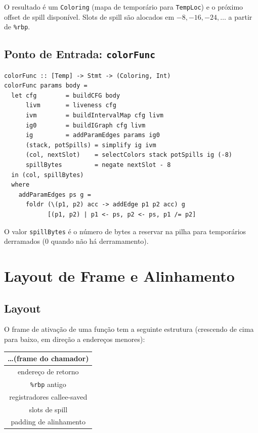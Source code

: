 O resultado é um \texttt{Coloring} (mapa de temporário para
\texttt{TempLoc}) e o próximo offset de spill disponível. Slots de spill
são alocados em $-8, -16, -24, \ldots$ a partir de \texttt{\%rbp}.

\subsection{Ponto de Entrada: \texttt{colorFunc}}

\begin{verbatim}
colorFunc :: [Temp] -> Stmt -> (Coloring, Int)
colorFunc params body =
  let cfg        = buildCFG body
      livm       = liveness cfg
      ivm        = buildIntervalMap cfg livm
      ig0        = buildIGraph cfg livm
      ig         = addParamEdges params ig0
      (stack, potSpills) = simplify ig ivm
      (col, nextSlot)    = selectColors stack potSpills ig (-8)
      spillBytes         = negate nextSlot - 8
  in (col, spillBytes)
  where
    addParamEdges ps g =
      foldr (\(p1, p2) acc -> addEdge p1 p2 acc) g
            [(p1, p2) | p1 <- ps, p2 <- ps, p1 /= p2]
\end{verbatim}

O valor \texttt{spillBytes} é o número de bytes a reservar na pilha para
temporários derramados ($0$ quando não há derramamento).

\section{Layout de Frame e Alinhamento}

\subsection{Layout}

O frame de ativação de uma função tem a seguinte estrutura (crescendo
de cima para baixo, em direção a endereços menores):

\begin{center}
  \begin{tabular}{|c|}
    \hline
    \ldots (frame do chamador) \\
    \hline
    endereço de retorno  \\
    \hline
    \texttt{\%rbp} antigo  \\
    \hline
    registradores callee-saved  \\
    \hline
    slots de spill  \\
    \hline
    padding de alinhamento \\
    \hline
  \end{tabular}
\end{center}

